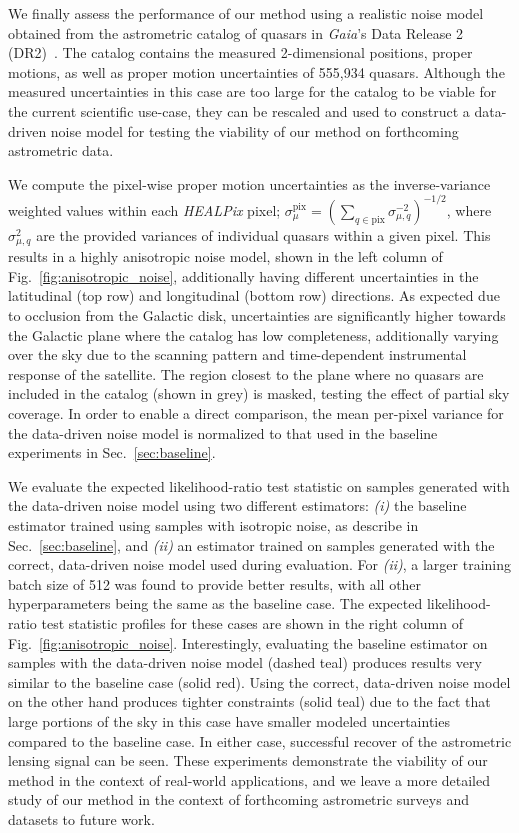 \documentclass[twocolumn]{aastex631}
\newcommand{\package}[1]{\textsl{#1}\xspace}
\newcommand{\healpix}{\package{HEALPix}}
\begin{document}
{We finally assess the performance of our method using a realistic noise model obtained from the astrometric catalog of quasars in \emph{Gaia}'s Data Release 2 (DR2)~\citep{2018A&A...616A...1G,2018A&A...616A...2L}. The catalog contains the measured 2-dimensional positions, proper motions, as well as proper motion uncertainties of 555,934 quasars. Although the measured uncertainties in this case are too large for the catalog to be viable for the current scientific use-case, they can be rescaled and used to construct a data-driven noise model for testing the viability of our method on forthcoming astrometric data.

We compute the pixel-wise proper motion uncertainties as the inverse-variance weighted values within each \healpix pixel; $\sigma_{\mu}^\mathrm{pix} = \left(\sum_{q\in\mathrm{pix}}\sigma_{\mu, q}^{-2}\right)^{-1/2}$, where $\sigma_{\mu, q}^{2}$ are the provided variances of individual quasars within a given pixel. This results in a highly anisotropic noise model, shown in the left column of Fig.~\ref{fig:anisotropic_noise}, additionally having different uncertainties in the latitudinal (top row) and longitudinal (bottom row) directions. As expected due to occlusion from the Galactic disk, uncertainties are significantly higher towards the Galactic plane where the catalog has low completeness, additionally varying over the sky due to the scanning pattern and time-dependent instrumental response of the satellite. The region closest to the plane where no quasars are included in the catalog (shown in grey) is masked, testing the effect of partial sky coverage. In order to enable a direct comparison, the mean per-pixel variance for the data-driven noise model is normalized to that used in the baseline experiments in Sec.~\ref{sec:baseline}.

We evaluate the expected likelihood-ratio test statistic on samples generated with the data-driven noise model using two different estimators: \emph{(i)} the baseline estimator trained using samples with isotropic noise, as describe in Sec.~\ref{sec:baseline}, and \emph{(ii)} an estimator trained on samples generated with the correct, data-driven noise model used during evaluation. For \emph{(ii)}, a larger training batch size of 512 was found to provide better results, with all other hyperparameters being the same as the baseline case. The expected likelihood-ratio test statistic profiles for these cases are shown in the right column of Fig.~\ref{fig:anisotropic_noise}. Interestingly, evaluating the baseline estimator on samples with the data-driven noise model (dashed teal) produces results very similar to the baseline case (solid red). Using the correct, data-driven noise model on the other hand produces tighter constraints (solid teal) due to the fact that large portions of the sky in this case have smaller modeled uncertainties compared to the baseline case. In either case, successful recover of the astrometric lensing signal can be seen. These experiments demonstrate the viability of our method in the context of real-world applications, and we leave a more detailed study of our method in the context of forthcoming astrometric surveys and datasets to future work.}
\end{document}

